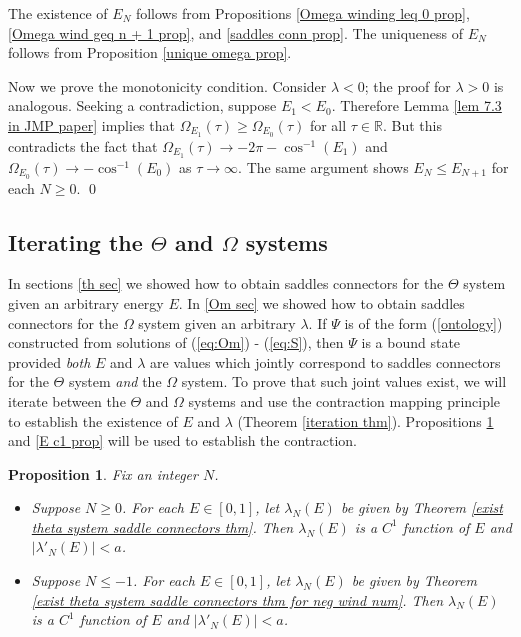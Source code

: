 \documentclass[11 pt]{article}
\newtheorem{prop}[thm]{Proposition}%
\renewcommand\l{\lambda}
\renewcommand\({\left(}
\renewcommand\){\right)}
\newcommand\<{\langle}
\renewcommand\>{\rangle}
\renewcommand\l{\lambda}
\newcommand\8{\infty}
\newcommand{\R}{\mathbb R}
\begin{document}
\proof
The existence of $E_N$ follows from Propositions \ref{Omega winding leq 0 prop}, \ref{Omega wind geq n + 1 prop}, and  \ref{saddles conn prop}. The uniqueness of $E_N$ follows from Proposition \ref{unique omega prop}. 

Now we prove the monotonicity condition. Consider $\l < 0$; the proof for $\l > 0$ is analogous. Seeking a contradiction, suppose $E_1 < E_0$.  Therefore Lemma \ref{lem 7.3 in JMP paper} implies that $\Omega_{E_1}(\tau) \geq \Omega_{E_0}(\tau)$ for all $\tau \in \R$. But this contradicts the fact that $\Omega_{E_1}(\tau) \to -2\pi - \cos^{-1}(E_1)$ and $\Omega_{E_0}(\tau) \to -\cos^{-1}(E_0)$ as $\tau \to \infty$. The same argument shows $E_N \leq E_{N+1}$ for each $N \geq 0$. 
\qed


\medskip
\medskip

\subsection{Iterating the $\Theta$ and $\Omega$ systems}

\medskip

In sections \ref{th sec} we showed how to obtain saddles connectors for the $\Theta$ system given an arbitrary energy $E$. In \ref{Om sec} we showed how to obtain saddles connectors for the $\Omega$ system given an arbitrary $\l$. If $\Psi$ is of the form (\ref{ontology}) constructed from solutions of (\ref{eq:Om}) - (\ref{eq:S}), then $\Psi$ is a bound state provided \emph{both} $E$ and $\l$ are values which jointly correspond to saddles connectors for the $\Theta$ system \emph{and} the $\Omega$ system. To prove that such joint values exist, we will iterate between the $\Theta$ and $\Omega$ systems and use the contraction mapping principle to establish the existence of $E$ and $\l$ (Theorem \ref{iteration thm}). Propositions \ref{lambda c1 prop} and \ref{E c1 prop} will be used to establish the contraction. 

\medskip
\medskip

\begin{prop}\label{lambda c1 prop} Fix an integer $N$. 
\begin{itemize}
\item[$\bullet$] Suppose $N \geq 0$. For each $E \in [0,1]$, let $\l_N(E)$ be given by Theorem \emph{\ref{exist theta system saddle connectors thm}}. Then $\l_N(E)$ is a $C^1$ function of $E$ and $|\l'_N(E)| < a$.
\item[$\bullet$] Suppose $N \leq -1$. For each $E \in [0,1]$, let $\l_N(E)$ be given by Theorem \emph{\ref{exist theta system saddle connectors thm for neg wind num}}. Then $\l_N(E)$ is a $C^1$ function of $E$ and $|\l'_N(E)| < a$.
\end{itemize}
\end{prop}
\end{document}
